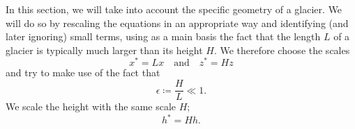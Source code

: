 In this section, we will take into account the specific geometry of a glacier.  We will do so by rescaling the equations in an appropriate way and identifying (and later ignoring) small terms, using as a main basis the fact that the length $L$ of a glacier is typically much larger than its height $H$. We therefore choose the scales
%
\begin{equation*}
    x^* = Lx \quad \text{and} \quad z^*=Hz
\end{equation*}
%
and try to make use of the fact that
%
\begin{equation*}
    \epsilon \coloneqq \frac{H}{L} \ll 1.
\end{equation*}
%
We scale the height with the same scale $H$;
%
\begin{equation*}
    h^* = Hh.
\end{equation*}
